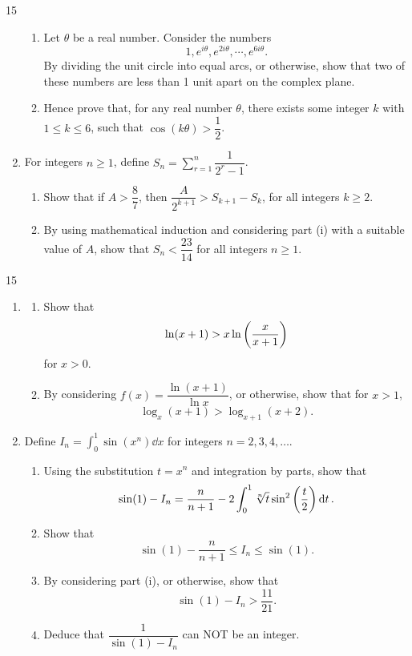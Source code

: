 \documentclass[12pt]{extarticle}
\begin{document}
\begin{shortanswer}
\begin{bookletquestion}{15}
\begin{enumerate}
			      \begin{enumerate}
				      \item {} Let $\theta$ be a real number.
				            Consider the numbers
				            \[1,e^{i\theta},e^{2i\theta},\cdots,e^{6i\theta}.\]
				            By dividing the unit circle into equal arcs, or otherwise, show that two of these numbers are less than 1 unit apart on the complex plane.
				      \item {} Hence prove that, for any real number $\theta$, there exists some integer $k$ with $1\leq k \leq 6$, such that $\cos(k\theta)>\dfrac{1}{2}$.
			      \end{enumerate}
			\item For integers $n\geq 1$, define $S_n=\sum_{r=1}^n\dfrac{1}{2^r-1}$.
			      \begin{enumerate}
				      \item {} Show that if $A>\dfrac{8}{7}$, then $\dfrac{A}{2^{k+1}}>S_{k+1}-S_k$, for all integers $k\geq2$.
				      \item {} By using mathematical induction and considering part (i) with a suitable value of $A$, show that $S_n<\dfrac{23}{14}$ for all integers $n\geq1$.
			      \end{enumerate}
		\end{enumerate}
		\questionend
	\end{bookletquestion}
	\pagebreak
	\begin{bookletquestion}{15}
		\begin{enumerate}
			\item
			      \begin{enumerate}
				      \item {} Show that
				            \[\ln(x+1)>x\ln\qty(\dfrac{x}{x+1})\]
				            for $x>0$.
				      \item {} By considering $f(x)=\dfrac{\ln(x+1)}{\ln x}$, or otherwise, show that for $x>1$,
				            \[\log_{x}(x+1)>\log_{x+1}(x+2).\]
			      \end{enumerate}

			\item Define $I_n=\int^1_0\sin(x^n)\dd{x}$ for integers $n=2,3,4,\dots$.
			      \begin{enumerate}
				      \item {} Using the substitution $t=x^n$ and integration by parts, show that
				            \[\sin(1)-I_n=\dfrac{n}{n+1}-2\int^1_0\sqrt[n]{t}\sin^2\qty(\dfrac{t}{2})\dd{t}.\]
				      \item {} Show that
				            \[\sin(1)-\dfrac{n}{n+1}\leq I_n\leq\sin(1).\]
				      \item {} By considering part (i), or otherwise, show that
				            \[\sin(1)-I_n>\dfrac{11}{21}.\]
				      \item {} Deduce that $\dfrac{1}{\sin(1)-I_n}$ can NOT be an integer.
			      \end{enumerate}
		\end{enumerate}
	\end{bookletquestion}
\end{shortanswer}
\end{document}
